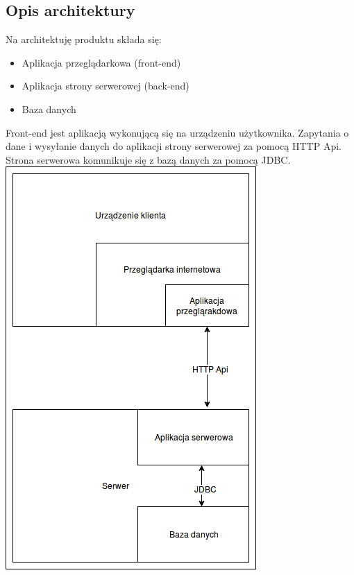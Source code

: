 \documentclass[polish,12pt]{aghthesis}
\begin{document}
\subsection{Opis architektury}
Na architektuję produktu składa się:
\begin{itemize}
    \item Aplikacja przeglądarkowa (front-end)
    \item Aplikacja strony serwerowej (back-end)
    \item Baza danych
\end{itemize}
Front-end jest aplikacją wykonującą się na urządzeniu użytkownika. Zapytania o dane i wysyłanie danych do aplikacji strony serwerowej za pomocą HTTP Api. Strona serwerowa komunikuje się z bazą danych za pomocą JDBC.
\includegraphics{komunikacja-serwer-klient-okolny}
\end{document}
